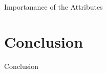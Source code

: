 \documentclass[aspectratio=1610, professionalfonts, 9pt]{beamer}
\begin{document}
  \begin{frame}{Importanance of the Attributes}
  \end{frame}

\section{Conclusion}
  \begin{frame}{Conclusion}
  \end{frame}
\end{document}
